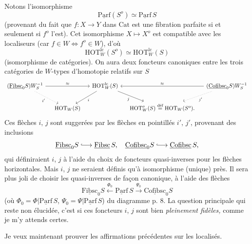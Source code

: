 \documentclass[11pt]{article}
\newcommand{\printedpage}[1]{\marginpar{\footnotesize p.~#1}}
\newcommand{\msp}[1]{\marginpar{\footnotesize [#1]}}
\newcommand{\Cat}{\mathrm{Cat}}
\newcommand{\uc}[1]{\underline{\mathrm{#1}}}
\newcommand{\HOT}{\mathrm{HOT}}
\newcommand{\defeq}{\overset{\text{déf}}{=}}
\begin{document}
\msp{page 51}

Notons l'isomorphisme
\[
\uc{Parf}(S^o) \simeq \uc{Parf}\,S
\]
(provenant du fait que $f : X \longrightarrow Y$ dans $\Cat$ est une fibration parfaite si et seulement si $f^o$ l'est). Cet isomorphisme $X \longmapsto X^o$ est compatible avec les localiseurs (car $f \in W \Longleftrightarrow f^o \in W$), d'où
\[
\HOT^{\mathrm{lc}}_W(S^o) \simeq \HOT^{\mathrm{lc}}_W(S)
\]
(isomorphisme de catégories). On aura deux foncteurs canoniques entre les trois catégories de $W$-types d'homotopie relatifs sur $S$
\[
\begin{tikzcd}[column sep=small]
(\uc{Fibsc}_0S)W_S^{-1} \arrow[rr, "\approx"] \arrow[dr, dotted, "i'"'] & & \HOT^{\mathrm{lc}}_W(S) \arrow[dl, "i"] \arrow[dr, "j"'] & & (\uc{Cofibsc}_0S)W_S^{-1} \arrow[ll, "\approx"'] \arrow[dl, dotted, "j'"] \\
& \HOT_W(S) & & \HOT^o_W(S) \defeq \HOT_W(S^o). &
\end{tikzcd}
\]
\printedpage{32}
 Ces flèches $i$, $j$ sont suggerées par les flèches en pointillés $i'$, $j'$, provenant des inclusions %
\[
\uc{Fibsc}_0S \lhook\joinrel\longrightarrow \uc{Fibsc}\,S,\quad \uc{Cofibsc}_0S \lhook\joinrel\longrightarrow \uc{Cofibsc}\,S,
\]
qui définiraient $i$, $j$ à l'aide du choix de foncteurs quasi-inverses pour les flèches horizontales. Mais $i$, $j$ ne seraient définis qu'à isomorphisme (unique) près. Il sera plus joli de choisir les quasi-inverses de façon canonique, à l'aide des flèches
\[
\uc{Fibsc}_0S \xleftarrow{\Phi_0} \uc{Parf}\,S \xrightarrow{\Psi_0} \uc{Cofibsc}_0S
\]
(où $\Phi_0 = \Phi|\uc{Parf}\,S$, $\Psi_0 = \Psi|\uc{Parf}\,S$) du diagramme p. 8. La question principale
\msp{page 52}
qui reste non élucidée, c'est si ces foncteurs $i$, $j$ sont bien \textit{pleinement fidèles,} comme je m'y attends certes.

Je veux maintenant prouver les affirmations précédentes sur les localisés.
\end{document}
